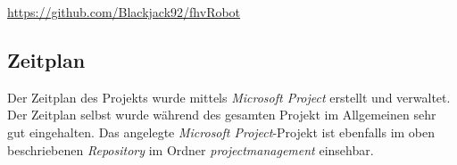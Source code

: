 \url{https://github.com/Blackjack92/fhvRobot} \\

\subsection{Zeitplan}
Der Zeitplan des Projekts wurde mittels \textit{Microsoft Project} erstellt und verwaltet. Der Zeitplan selbst wurde während des gesamten Projekt im Allgemeinen sehr gut eingehalten. Das angelegte \textit{Microsoft Project}-Projekt ist ebenfalls im oben beschriebenen \textit{Repository} im Ordner \textit{projectmanagement} einsehbar.

\pagebreak 